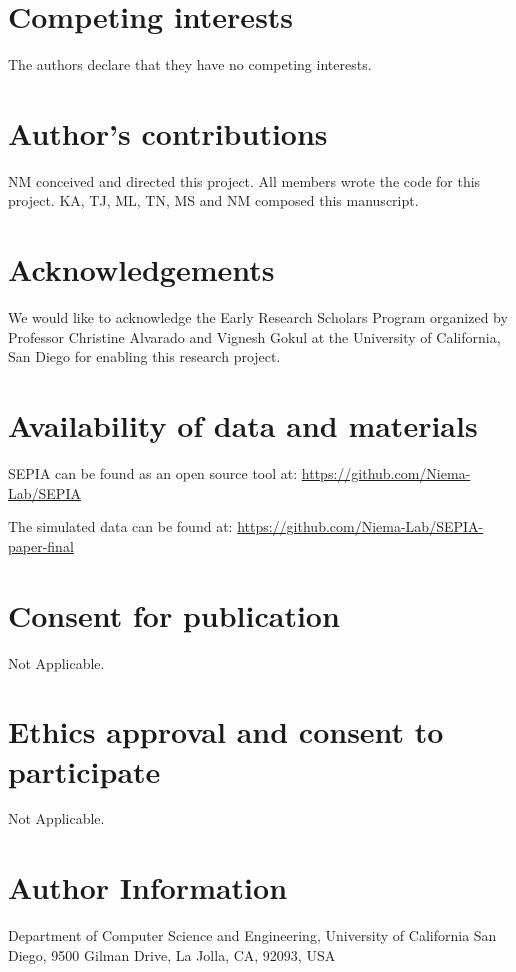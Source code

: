 \documentclass[twocolumn]{bmcart}%
\begin{document}
\begin{backmatter}

\section*{Competing interests}
  The authors declare that they have no competing interests.

\section*{Author's contributions}
    NM conceived and directed this project. All members wrote the code for this project. KA, TJ, ML, TN, MS and NM composed this manuscript.
    
\section*{Acknowledgements}
 We would like to acknowledge the Early Research Scholars Program organized by Professor Christine Alvarado and Vignesh Gokul at the University of California, San Diego for enabling this research project.
  
\section*{Availability of data and materials}
SEPIA can be found as an open source tool at: \href{https://github.com/Niema-Lab/SEPIA}{https://github.com/Niema-Lab/SEPIA}

The simulated data can be found at: \href{https://github.com/Niema-Lab/SEPIA-paper-final}{https://github.com/Niema-Lab/SEPIA-paper-final}

\section*{Consent for publication}
    Not Applicable.
    
\section*{Ethics approval and consent to participate}
    Not Applicable.
    
\section*{Author Information}
    Department of Computer Science and Engineering, University of California San Diego, 9500 Gilman Drive, La Jolla, CA, 92093, USA
    

\end{backmatter}
\end{document}
